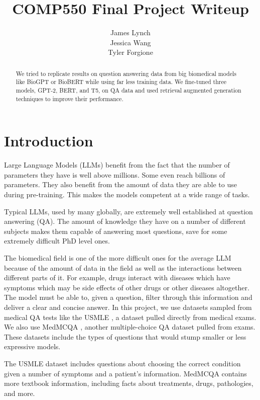 \documentclass{article}
\title{COMP550 Final Project Writeup}
\author{
  James Lynch \\
  \And
  Jessica Wang \\
  \And
  Tyler Forgione \\
}
\begin{document}
\maketitle

\begin{abstract}
    We tried to replicate results on question answering data from big biomedical models like BioGPT or BioBERT while using far less training data. We fine-tuned three models, GPT-2, BERT, and T5, on QA data and used retrieval augmented generation techniques to improve their performance.
\end{abstract}


\section{Introduction}

Large Language Models (LLMs) benefit from the fact that the number of parameters they have is well above millions. Some even reach billions of parameters. They also benefit from the amount of data they are able to use during pre-training. This makes the models competent at a wide range of tasks.

Typical LLMs, used by many globally, are extremely well established at question answering (QA). The amount of knowledge they have on a number of different subjects makes them capable of answering most questions, save for some extremely difficult PhD level ones.

The biomedical field is one of the more difficult ones for the average LLM because of the amount of data in the field as well as the interactions between different parts of it. For example, drugs interact with diseases which have symptoms which may be side effects of other drugs or other diseases altogether. The model must be able to, given a question, filter through this information and deliver a clear and concise answer. In this project, we use datasets sampled from medical QA tests like the USMLE \cite{jin2020disease}, a dataset pulled directly from medical exams. We also use MedMCQA \cite{pmlr-v174-pal22a}, another multiple-choice QA dataset pulled from exams. These datasets include the types of questions that would stump smaller or less expressive models.

The USMLE dataset includes questions about choosing the correct condition given a number of symptoms and a patient's information. MedMCQA contains more textbook information, including facts about treatments, drugs, pathologies, and more.
\end{document}
